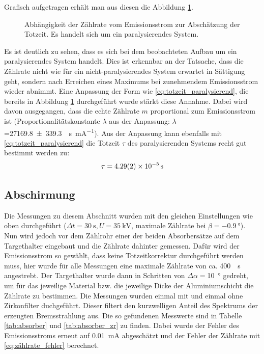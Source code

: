 \documentclass[11pt, a4paper]{article}
\numberwithin{equation}{section}
\begin{document}
Grafisch aufgetragen erhält man aus diesen die Abbildung \ref{fig:totzeit}.
\begin{figure}[ht]
	\centering
	
	\caption{Abhängigkeit der Zählrate vom Emissionsstrom zur Abschätzung der Totzeit. Es handelt sich um ein paralysierendes System.}
	\label{fig:totzeit}
\end{figure}
Es ist deutlich zu sehen, dass es sich bei dem beobachteten Aufbau um ein paralysierendes System handelt.
Dies ist erkennbar an der Tatsache, dass die Zählrate nicht wie für ein nicht-paralysierendes System erwartet in Sättigung geht, sondern nach Erreichen eines Maximums bei zunehmendem Emissionsstrom wieder abnimmt.
Eine Anpassung der Form wie \eqref{eq:totzeit_paralysierend}, die bereits in Abbildung \ref{fig:totzeit} durchgeführt wurde stärkt diese Annahme.
Dabei wird davon ausgegangen, dass die echte Zählrate $m$ proportional zum Emissionsstrom ist (Proportionalitätskonstante $\lambda$ aus der Anpassung: $\lambda$=\SI{27169.8+-339.3}{\per\second\per\milli\ampere}).
Aus der Anpassung kann ebenfalls mit \eqref{eq:totzeit_paralysierend} die Totzeit $\tau$ des paralysierenden Systems recht gut bestimmt werden zu:
\begin{align}
\tau = \SI{4.29 +- 0.02e-5}{\second}
\end{align}

\subsection{Abschirmung}

Die Messungen zu diesem Abschnitt wurden mit den gleichen Einstellungen wie oben durchgeführt ($\Delta t=\SI{30}{\second}, U=\SI{35}{\kilo\volt}$, maximale Zählrate bei $\beta=\SI{-0.9}{\degree}$).
Nun wird jedoch vor dem Zählrohr einer der beiden Absorbersätze auf dem Targethalter eingebaut und die Zählrate dahinter gemessen.
Dafür wird der Emissionsstrom so gewählt, dass keine Totzeitkorrektur durchgeführt werden muss, hier wurde für alle Messungen eine maximale Zählrate von ca. \SI{400}{\per\second} angestrebt.
Der Targethalter wurde dann in Schritten von $\Delta\alpha=$\SI{10}{\degree} gedreht, um für das jeweilige Material bzw. die jeweilige Dicke der Aluminiumschicht die Zählrate zu bestimmen.
Die Messungen wurden einmal mit und einmal ohne Zirkonfilter duchgeführt.
Dieser filtert den kurzwelligen Anteil des Spektrums der erzeugten Bremsstrahlung aus.
Die so gefundenen Messwerte sind in Tabelle \ref{tab:absorber} und \ref{tab:absorber_zr} zu finden.
Dabei wurde der Fehler des Emissionsstroms erneut auf \SI{0.01}{\milli\ampere} abgeschätzt und der Fehler der Zählrate mit \eqref{eq:zählrate_fehler} berechnet.
\end{document}
